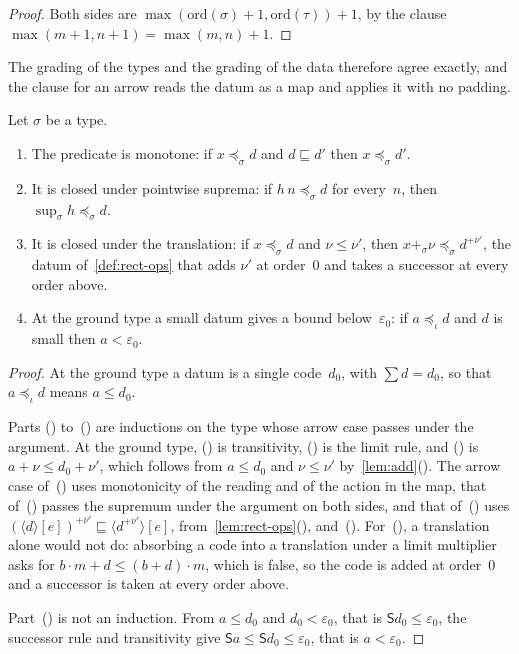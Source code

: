 \documentclass[11pt]{amsart}
\makeatletter
\newcommand{\gr}{\iota}                      %
\newcommand{\bS}{\mathsf{S}}
\newcommand{\bplus}{\mathbin{+}}
\newcommand{\btimes}{\mathbin{\cdot}}
\newcommand{\eps}{\varepsilon_{0}}
\newcommand{\ord}{\mathrm{ord}}
\newcommand{\tsum}[1]{\textstyle\sum #1}
\newcommand{\tle}{\mathrel{\sqsubseteq}}      %
\newcommand{\dom}{\mathrel{\preccurlyeq}}     %
\newcommand{\act}[2]{#1[#2]}                  %
\newcommand{\rd}[1]{\langle #1 \rangle}       %
\newif\ifagdarefs
\newcommand{\AgdaRefs}[1]{\ifagdarefs{\footnotesize\color{agdablue}(#1)}\else\unskip\fi}
\newcommand{\Agda}[2]{{\footnotesize\color{agdablue}\textsf{#1}%
  \ifblank{#2}{}{\texttt{.}\allowbreak\texttt{#2}}}}
\let\ttt@plain\texttt
\renewcommand{\texttt}[1]{{\footnotesize\color{agdablue}\ttt@plain{#1}}}
\theoremstyle{plain}
\theoremstyle{definition}
\makeatother
\begin{document}
\begin{proof}
Both sides are $\max(\ord(\sigma)+1, \ord(\tau))+1$, by the clause
$\max(m+1,n+1) = \max(m,n)+1$.
\end{proof}

The grading of the types and the grading of the data therefore agree
exactly, and the clause for an arrow reads the datum as a map and
applies it with no padding.

\begin{lemma}
\label{lem:dom-closure}
Let $\sigma$ be a type.
\begin{enumerate}
\item\label{item:dom-mono}
  The predicate is monotone: if $x \dom_{\sigma} d$ and
  $d \tle d'$ then $x \dom_{\sigma} d'$.
\item\label{item:dom-sup}
  It is closed under pointwise suprema: if $h\,n \dom_{\sigma} d$ for
  every~$n$, then $\sup_{\sigma} h \dom_{\sigma} d$.
\item\label{item:dom-add}
  It is closed under the translation: if $x \dom_{\sigma} d$ and
  $\nu \le \nu'$, then
  $x \bplus_{\sigma} \nu \dom_{\sigma} d^{+\nu'}$, the datum
  of~\cref{def:rect-ops} that adds $\nu'$ at order~$0$ and takes a
  successor at every order above.
\item\label{item:dom-eps}
  At the ground type a small datum gives a bound below~$\eps$: if
  $a \dom_{\gr} d$ and $d$ is small then $a < \eps$.
\end{enumerate}
\AgdaRefs{\Agda{DialogueTrees.Predicate}{Dom-mono};
\texttt{Dom-sup},
\texttt{Dom-⊕}, \texttt{Dom-<-ε₀}.}
\end{lemma}

\begin{proof}
At the ground type a datum is a single code~$d_0$, with
$\tsum d = d_0$, so that $a \dom_{\gr} d$ means $a \le d_0$.

Parts ()
to~() are inductions on the type whose arrow
case passes under the argument. At the ground type,
() is transitivity,
() is the limit rule, and
() is $a \bplus \nu \le d_0 \bplus \nu'$,
which follows from $a \le d_0$ and $\nu \le \nu'$
by~\cref{lem:add}(). The arrow case
of~() uses monotonicity of the reading and of
the action in the map, that of~() passes the
supremum under the argument on both sides, and that
of~() uses
$(\act{\rd d}{e})^{+\nu'} \tle \act{\rd{d^{+\nu'}}}{e}$,
from~\cref{lem:rect-ops}(),
and~(). For~(), a
translation alone would not do: absorbing a code into a translation
under a limit multiplier asks for
$b \btimes m \bplus d \le (b \bplus d) \btimes m$, which is false, so
the code is added at order~$0$ and a successor is taken at every order
above.

Part~() is not an induction. From $a \le d_0$
and $d_0 < \eps$, that is $\bS d_0 \le \eps$, the successor rule and
transitivity give $\bS a \le \bS d_0 \le \eps$, that is $a < \eps$.
\end{proof}
\end{document}
